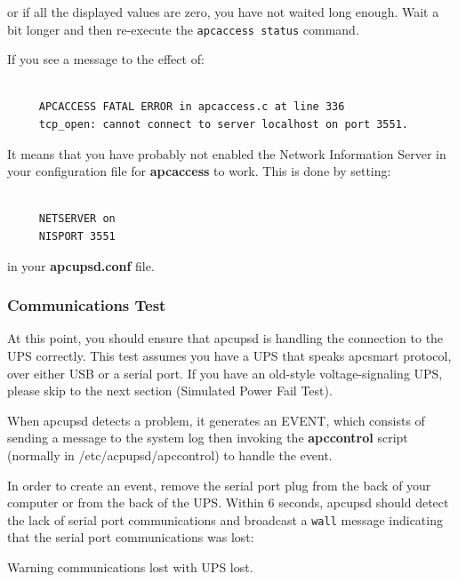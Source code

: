 {{or if all the displayed values are zero, you have not waited long enough. Wait
a bit longer and then re-execute the {\tt apcaccess status} command.  

If you see a message to the effect of: 

\footnotesize
\begin{verbatim}
     
     APCACCESS FATAL ERROR in apcaccess.c at line 336
     tcp_open: cannot connect to server localhost on port 3551.
\end{verbatim}
\normalsize

It means that you have probably not enabled the Network Information Server in
your configuration file for {\bf apcaccess} to work. This is done by setting: 

\footnotesize
\begin{verbatim}
     
     NETSERVER on
     NISPORT 3551
\end{verbatim}
\normalsize

in your {\bf apcupsd.conf} file. 

\label{Communications-Test}

\subsubsection*{Communications Test}

\label{index-Testing_002c-Communications-91}
\label{index-Communications-Testing-92}
At this point, you should ensure that apcupsd is handling the connection to
the UPS correctly. This test assumes you have a UPS that speaks apcsmart
protocol, over either USB or a serial port.  If you have an old-style
voltage-signaling UPS, please skip to the next section (Simulated Power Fail
Test).  

When apcupsd detects a problem, it generates an EVENT, which consists of
sending a message to the system log then invoking the {\bf apccontrol} script
(normally in /etc/acpupsd/apccontrol) to handle the event.  

In order to create an event, remove the serial port plug from the back of your
computer or from the back of the UPS. Within 6 seconds, apcupsd should detect
the lack of serial port communications and broadcast a {\tt wall} message
indicating that the serial port communications was lost:  

Warning communications lost with UPS lost.  

}}
